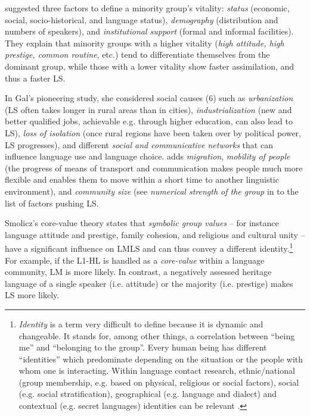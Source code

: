 \documentclass[output=paper]{langscibook}
\begin{document}
\textcite{Giles1977} suggested three factors to define a minority group's vitality: \emph{status} (economic, social, socio-historical, and language status), \emph{demography} (distribution and numbers of speakers), and \emph{institutional support} (formal and informal facilities). They explain that minority groups with a higher vitality (\emph{high attitude, high prestige, common routine}, etc.) tend to differentiate themselves from the dominant group, while those with a lower vitality show faster assimilation, and thus a faster LS.

In Gal's \parencite*{Gal1979} pioneering study, she considered social causes (6) such as \emph{urbanization} (LS often takes longer in rural areas than in cities), \emph{industrialization} (new and better qualified jobs, achievable e.g. through higher education, can also lead to LS), \emph{loss of isolation} (once rural regions have been taken over by political power, LS progresses), and different \emph{social and communicative networks} that can influence language use and language choice. \textcite{Dorian1980} adds \emph{migration}, \emph{mobility of people} (the progress of means of transport and communication makes people much more flexible and enables them to move within a short time to another linguistic environment), and \emph{community size} (see \emph{numerical strength of the group} in \textcite{Kloss1966} to the list of factors pushing LS.

Smolicz's \parencite*{Smolicz1980} core-value theory states that \emph{symbolic group values} -- for instance language attitude and prestige, family cohesion, and religious and cultural unity -- have a significant influence on LMLS and can thus convey a different identity.\footnote{\emph{Identity} is a term very difficult to define because it is dynamic and changeable. It stands for, among other things, a correlation between ``being me''  and ``belonging to the group''. Every human being has different ``identities'' which predominate depending on the situation or the people with whom one is interacting. Within language contact research, ethnic/national (group membership, e.g. based on physical, religious or social factors), social (e.g. social stratification), geographical (e.g. language and dialect) and contextual (e.g. secret languages) identities can be relevant \parencite[172--173]{Riehl2014}.} For example, if the L1-HL is handled as a \emph{core-value} within a language community, LM is more likely. In contrast, a negatively assessed heritage language of a single speaker (i.e. attitude) or the majority (i.e. prestige) makes LS more likely.
\end{document}
